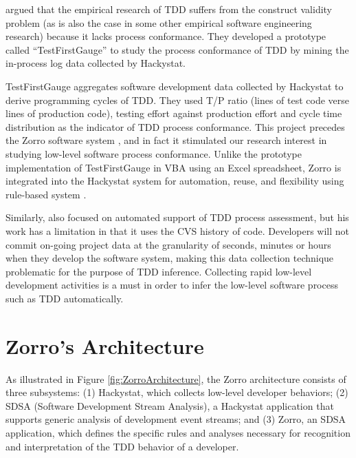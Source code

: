\documentclass[smallextended]{svjour3}     %
\begin{document}
\cite{Wang:04} argued that the empirical research 
of TDD suffers from the construct validity problem (as is also the 
case in some other empirical software engineering research) because 
it lacks process conformance. They developed a prototype called 
``TestFirstGauge'' to study the process conformance 
of TDD by mining the in-process log data collected by Hackystat. 

TestFirstGauge aggregates software development data collected
by Hackystat to derive programming cycles of TDD. They used T/P ratio 
(lines of test code verse lines of production code), testing effort 
against production effort and cycle time distribution as the indicator 
of TDD process conformance. This project precedes the Zorro software 
system \citep{csdl2-06-02}, and in fact it stimulated our research interest 
in studying low-level software process conformance. Unlike the
prototype implementation of TestFirstGauge in VBA using an Excel
spreadsheet, Zorro is integrated into the Hackystat system for automation,
reuse, and flexibility using rule-based system \citep{Friedman-Hill:03}.

Similarly, \cite{Wege:04} also focused on automated support of TDD
process assessment, but his work has a limitation in that it uses the CVS
history of code. Developers will not commit on-going project data at the
granularity of seconds, minutes or hours when they develop the software
system, making this data collection technique problematic for the purpose
of TDD inference. Collecting rapid low-level development activities is
a must in order to infer the low-level software process such as TDD
automatically.

\section{Zorro's Architecture}
\label{sec:sdsa}

As illustrated in Figure \ref{fig:ZorroArchitecture}, the Zorro
architecture consists of three subsystems: (1) Hackystat, which collects
low-level developer behaviors; (2) SDSA (Software Development Stream
Analysis), a Hackystat application that supports generic analysis of
development event streams; and (3) Zorro, an SDSA application, which
defines the specific rules and analyses necessary for recognition and
interpretation of the TDD behavior of a developer.
\end{document}
